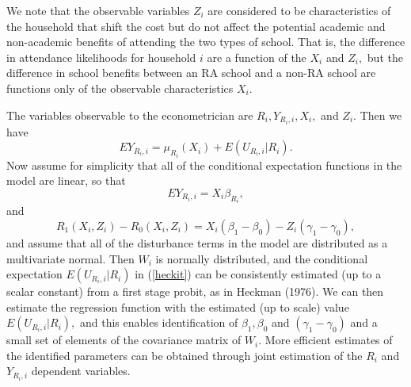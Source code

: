 We note that the observable variables $Z_{i}$ are considered to be characteristics of the household that shift the cost but do not affect the potential academic and non-academic benefits of attending the two types of school. That is, the difference in attendance likelihoods for household $i$ are a function of the $X_{i}$ and $Z_{i},$ but the difference in school benefits between an RA school and a non-RA school are functions only of the
observable characteristics $X_{i}.$

The variables observable to the econometrician are $R_{i},Y_{R_{i},i},X_{i},$ and $Z_{i}.$ Then we have%
\begin{equation}
EY_{R_{i},i}=\mu_{R_{i}}(X_{i})+E(U_{R_{i},i}|R_{i}).  \label{heckit}
\end{equation}%
Now assume for simplicity that all of the conditional expectation functions in the model are linear, so that%
\begin{equation*}
EY_{R_{i},i}=X_{i}\beta_{R_{i}},
\end{equation*}%
and%
\begin{equation*}
R_{1}(X_{i},Z_{i})-R_{0}(X_{i},Z_{i})=X_{i}(\beta_{1}-\beta_{0})-Z_{i}(\gamma_{1}-\gamma_{0}),
\end{equation*}%
and assume that all of the disturbance terms in the model are distributed as a multivariate normal. Then $W_{i}$ is normally distributed, and the conditional expectation $E(U_{R_{i},i}|R_{i})$ in (\ref{heckit}) can be consistently estimated (up to a scalar constant) from a first stage probit, as in Heckman (1976). We can then estimate the regression function with the estimated (up to scale) value $E(U_{R_{i},i}|R_{i}),$ and this enables identification of $\beta_{1},\beta_{0}$ and $(\gamma_{1}-\gamma_{0})$ and a small set of elements of the covariance matrix of $W_{i}.$ More efficient estimates of the identified parameters can be obtained through joint estimation of the $R_{i}$ and $Y_{R_{i},i}$ dependent variables.

%
